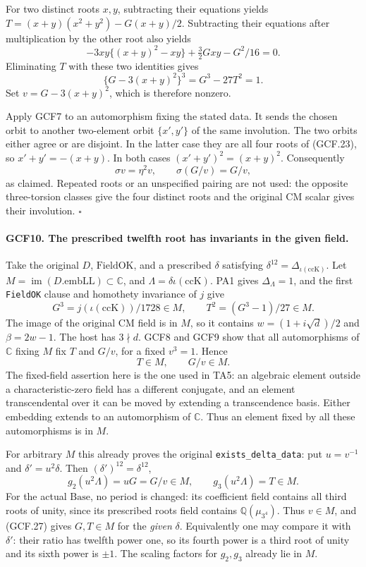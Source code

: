 For two distinct roots \(x,y\), subtracting their equations yields
\(T=(x+y)(x^2+y^2)-G(x+y)/2\).  Subtracting their equations after
multiplication by the other root also yields
\[
 -3xy\{(x+y)^2-xy\}+\tfrac32Gxy-G^2/16=0.
\]
Eliminating \(T\) with these two identities gives
\[
                   \{G-3(x+y)^2\}^3=G^3-27T^2=1.     \tag{GCF.24}
\]
Set \(v=G-3(x+y)^2\), which is therefore nonzero.

Apply GCF7 to an automorphism fixing the stated data.  It sends the
chosen orbit to another two-element orbit \(\{x',y'\}\) of the
same involution.  The two orbits either agree or are disjoint.
In the latter case they are all four roots of (GCF.23), so
\(x'+y'=-(x+y)\).  In both cases
\((x'+y')^2=(x+y)^2\).  Consequently
\[
 \sigma v=\eta^2v,\qquad
                 \sigma(G/v)=G/v,                   \tag{GCF.25}
\]
as claimed.  Repeated roots or an unspecified pairing are not used:
the opposite three-torsion classes give the four distinct roots and
the original CM scalar gives their involution.
\hfill\(\square\)

\paragraph{GCF10. The prescribed twelfth root has invariants in the given field.}
\label{claim:GCF10}
Take the original \(D\), \(\mathrm{FieldOK}\), and a prescribed
\(\delta\) satisfying
\(\delta^{12}=\Delta_{\iota(\mathrm{ccK})}\).
Let \(M=\operatorname{im}(D.\mathrm{embLL})\subset\mathbb C\),
and \(\Lambda=\delta\iota(\mathrm{ccK})\).
PA1 gives \(\Delta_\Lambda=1\), and the first \texttt{FieldOK}
clause and homothety invariance of \(j\) give
\[
  G^3=j(\iota(\mathrm{ccK}))/1728\in M,\qquad
                    T^2=(G^3-1)/27\in M.             \tag{GCF.26}
\]
The image of the original CM field is in \(M\), so it contains
\(w=(1+i\sqrt d)/2\) and \(\beta=2w-1\).
The host has \(3\nmid d\).  GCF8 and GCF9 show that all
automorphisms of \(\mathbb C\) fixing \(M\) fix \(T\) and
\(G/v\), for a fixed \(v^3=1\).  Hence
\[
                              T\in M,\qquad G/v\in M.
 \tag{GCF.27}
\]
The fixed-field assertion here is the one used in TA5: an algebraic
element outside a characteristic-zero field has a different conjugate,
and an element transcendental over it can be moved by extending a
transcendence basis.  Either embedding extends to an automorphism of
\(\mathbb C\).  Thus an element fixed by all these automorphisms is
in \(M\).

For arbitrary \(M\) this already proves the original
\texttt{exists\_delta\_data}: put \(u=v^{-1}\) and
\(\delta'=u^2\delta\).  Then \((\delta')^{12}=\delta^{12}\),
\[
             g_2(u^2\Lambda)=uG=G/v\in M,\qquad
                         g_3(u^2\Lambda)=T\in M.       \tag{GCF.28}
\]
For the actual \(\mathrm{Base}\), no period is changed: its
coefficient field contains all third roots of unity, since its
prescribed roots field contains \(\mathbb Q(\mu_{3^4})\).
Thus \(v\in M\), and (GCF.27) gives \(G,T\in M\) for the
\emph{given} \(\delta\).  Equivalently one may compare it with
\(\delta'\): their ratio has twelfth power one, so its fourth
power is a third root of unity and its sixth power is \(\pm1\).
The scaling factors for \(g_2,g_3\) already lie in \(M\).

